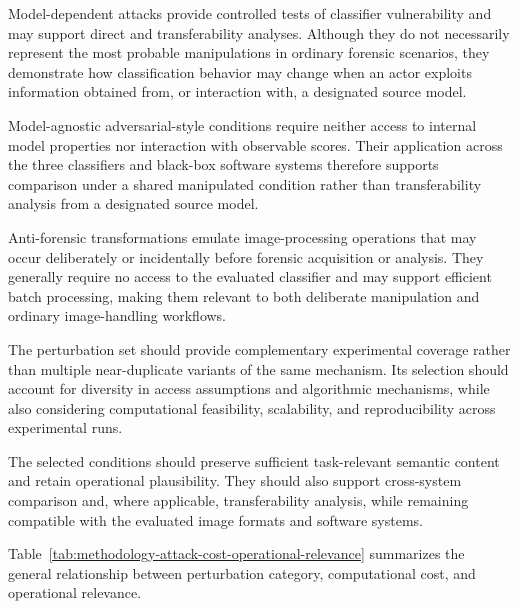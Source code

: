 Model-dependent attacks provide controlled tests of classifier vulnerability
and may support direct and transferability analyses. Although they do not
necessarily represent the most probable manipulations in ordinary forensic
scenarios, they demonstrate how classification behavior may change when an
actor exploits information obtained from, or interaction with, a designated
source model.

Model-agnostic adversarial-style conditions require neither access to internal
model properties nor interaction with observable scores. Their application
across the three classifiers and black-box software systems therefore supports
comparison under a shared manipulated condition rather than transferability
analysis from a designated source model.

Anti-forensic transformations emulate image-processing operations that may
occur deliberately or incidentally before forensic acquisition or analysis.
They generally require no access to the evaluated classifier and may support
efficient batch processing, making them relevant to both deliberate
manipulation and ordinary image-handling workflows.

The perturbation set should provide complementary experimental coverage rather
than multiple near-duplicate variants of the same mechanism. Its selection
should account for diversity in access assumptions and algorithmic mechanisms,
while also considering computational feasibility, scalability, and
reproducibility across experimental runs.

The selected conditions should preserve sufficient task-relevant semantic
content and retain operational plausibility. They should also support
cross-system comparison and, where applicable, transferability analysis, while
remaining compatible with the evaluated image formats and software systems.

Table~\ref{tab:methodology-attack-cost-operational-relevance} summarizes the
general relationship between perturbation category, computational cost, and
operational relevance.

